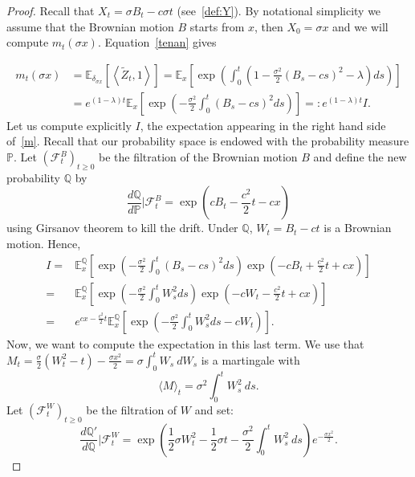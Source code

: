 \documentclass[10pt]{amsart}
\theoremstyle{definition}\newtheorem{defi}[theo]{Definition}\newtheorem{rema}[theo]{Remark}\newtheorem{exam}[theo]{Example}\newtheorem{exem}[theo]{Example}\newtheorem{nota}[theo]{Notation}
\newcommand{\Fo}{\mathcal{F}}
\renewcommand*\P{\mathbb{P}}
\newcommand*\E{\mathbb{E}}
\newcommand{\bbQ}{\mathbb{Q}}
\begin{document}
\begin{proof}
Recall that $X_{t}=\sigma B_{t}-c\sigma t$ (see~\eqref{def:Y}). By notational simplicity we assume that the Brownian motion $B$ starts from $x$, then $X_0=\sigma x$ and we will compute $m_{t}(\sigma x)$. Equation~\eqref{tenan} gives

\begin{equation}\label{m1}
\begin{split}
m_{t}(\sigma x)&=\E_{\delta_{\sigma x}}\left[\left\langle \widetilde{Z}_t, 1\right\rangle \right]=\E_{x}\left[\exp\left(\int_{0}^{t} \left(1-\frac{\sigma^2}{2}\left(B_{s}- c s\right)^2 -\lambda \right)ds \right)\right]\\
&=e^{(1-\lambda)t}\E_{x}\left[\exp\left(-\frac{\sigma^2}{2}\int_{0}^{t} \left(B_{s}-cs\right)^2 ds \right)\right]=: e^{(1-\lambda)t} I.
\end{split}
\end{equation}
Let us compute explicitly $I$, the expectation appearing in the right hand side of~\eqref{m}. Recall that our probability space is endowed with the probability measure $\P$. Let $(\Fo^B_{t})_{t \geq 0}$ be the filtration of the Brownian motion $B$ and define the new probability $\bbQ$ by
\[
\frac{d\bbQ}{d\P}\big|\Fo^B_{t}=\exp\left(cB_{t}-\frac{c^2}{2}t-cx\right)
\]
using Girsanov theorem to kill the drift. Under $\bbQ$, $W_{t}=B_{t}-ct$ is a Brownian motion. Hence,
\begin{equation}\label{etape1}
\begin{split}
I= & \E_{x}^{\bbQ}\left[\exp\left(-\frac{\sigma^2}{2}\int_{0}^{t} \left(B_{s}-cs\right)^2 ds \right)\exp\left(-cB_{t}+\frac{c^2}{2}t+cx\right)\right]\\
= & \E_{x}^{\bbQ}\left[\exp\left(-\frac{\sigma^2}{2}\int_{0}^{t} W_{s}^2 ds \right)\exp\left(-cW_{t}-\frac{c^2}{2}t+cx\right)\right]\\
= & e^{cx-\frac{c^2}{2}t}\E_{x}^{\bbQ}\left[\exp\left(-\frac{\sigma^2}{2}\int_{0}^{t} W_{s}^2 ds-cW_{t} \right)\right].
\end{split}
\end{equation}
Now, we want to compute the expectation in this last term. We use that $M_{t}=\tfrac{\sigma}{2}(W_{t}^2-t)-\tfrac{\sigma x^2}{2} = \sigma \int_{0}^t W_{s}\ dW_{s} $ is a martingale with
\[
\langle M\rangle_{t}=\sigma^2\int_{0}^{t}W_{s}^2\ ds.
\]
Let $(\Fo^W_{t})_{t \geq 0}$ be the filtration of $W$ and set:
\[
\frac{d\bbQ'}{d\bbQ}\Big|\Fo^W_{t}=\exp\left(\frac{1}{2}\sigma W_{t}^2-\frac{1}{2}\sigma t-\frac{\sigma^2}{2}\int_{0}^{t}W_{s}^{2}\ ds\right)e^{-\frac{\sigma x^2}{2}}.
\]
\end{proof}
\end{document}
